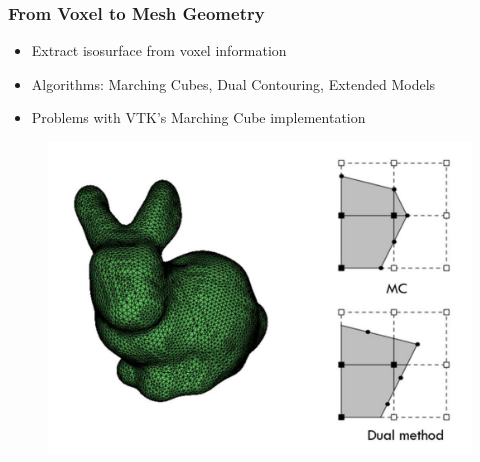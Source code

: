 \begin{frame}

	\frametitle{From Voxel to Mesh Geometry}
	
	\begin{itemize}
	\item Extract isosurface from voxel information
	\item Algorithms: Marching Cubes, Dual Contouring, Extended Models
	\item Problems with VTK's Marching Cube implementation
	\end{itemize}
	\begin{figure}
	\includegraphics[scale=0.35]{Pictures/bunny_MC.pdf}
	\end{figure}
	
\end{frame}


